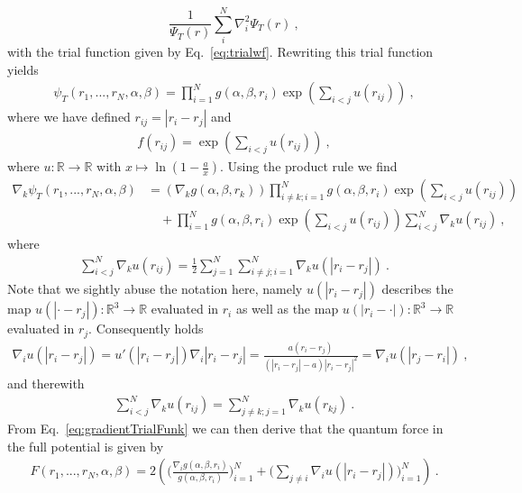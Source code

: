 \documentclass[11pt,a4paper]{article}
\numberwithin{equation}{section}
\begin{document}
\begin{equation*}
\frac{1}{\Psi_T({r})}\sum_i^{N}\nabla_i^2\Psi_T({r})~,
\end{equation*}
with the trial function given by Eq.~\eqref{eq:trialwf}.
%
Rewriting this trial function yields
\begin{align*}
\psi_T(r_1,...,r_N,\alpha,\beta)=\prod_{i=1}^N g(\alpha,\beta,{r}_i)\exp{\left(\sum_{i<j}u(r_{ij})\right)}~,
\end{align*}
where we have defined $r_{ij}=|{r}_i-{r}_j|$ and 
\begin{align*}
f(r_{ij})= \exp{\left(\sum_{i<j}u(r_{ij})\right)}~,
\end{align*}
where $u:\mathbb{R}\to \mathbb{R}$ with $x\mapsto \ln \left(1-\frac{a}{x}\right)$.
%
Using the product rule we find
\begin{equation}
\label{eq:gradientTrialFunk}
\begin{aligned}
\nabla_k\psi_T(r_1,...,r_N,\alpha,\beta)
&=
\left(\nabla_kg(\alpha,\beta,{r}_k)\right)\prod_{i\neq k;i=1}^N g(\alpha,\beta,{r}_i)\exp{\left(\sum_{i<j}u(r_{ij})\right)}\\
&\quad +\prod_{i=1}^N g(\alpha,\beta,{r}_i)\exp{\left(\sum_{i<j}u(r_{ij})\right)}\sum_{i<j}^N\nabla_ku(r_{ij})~,
\end{aligned}
\end{equation}
where 
\begin{align*}
\sum_{i<j}^N\nabla_ku(r_{ij})
=
\frac{1}{2}\sum_{j=1}^N\sum_{i\neq j;i=1}^N\nabla_k u(|r_i-r_j|) ~.
\end{align*}
Note that we sightly abuse the notation here, namely $u(|r_i-r_j|)$ describes the map $u(|\cdot -r_j|):\mathbb{R}^3\to \mathbb{R}$ evaluated in $r_i$ as well as the map $u(|r_i -\cdot|):\mathbb{R}^3\to \mathbb{R}$ evaluated in $r_j$.
%
Consequently holds
\begin{align}
\label{eq:nablaU}
\nabla_i u(|r_i-r_j|)
=
u'(|r_i-r_j|)\nabla_i |r_i-r_j|
=
\frac{a(r_i-r_j)}{(|r_i-r_j|-a)|r_i-r_j|^2}=\nabla_i u(|r_j-r_i|)~,
\end{align} 
and therewith
\begin{align*}
\sum_{i<j}^N\nabla_ku(r_{ij})
=\sum_{j\neq k;j=1}^N\nabla_k u(r_{kj})~.
\end{align*}
From Eq.~\eqref{eq:gradientTrialFunk} we can then derive that the quantum force in the full potential is given by
\begin{align*}
F(r_1,...,r_N,\alpha,\beta)
=
2\left(
\Bigg(\frac{\nabla_i g(\alpha,\beta,{r}_i)}{g(\alpha,\beta,{r}_i)}\Bigg)_{i=1}^N
+
\Bigg(\sum_{j\neq i}\nabla_i u(|r_i-r_j|) \Bigg)_{i=1}^N
\right)~.
\end{align*}
\end{document}
